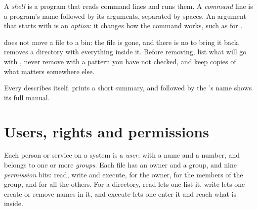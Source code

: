 \begin{definition}\label{def:g11:os-and-command-line:shell}
A \emph{shell} is a program that reads command lines and runs them. A \emph{command}
line is a program's name followed by its arguments, separated by spaces. An argument that starts with \code{-} is an
\emph{option}: it changes how the command works, such as  for .
\end{definition}

\label{out:g11:os-and-command-line:copy-move}

\begin{safety}
 does not move a file to a bin: the file is gone, and there is no  to bring it back. 
removes a directory with everything inside it. Before removing, list what will go with , never remove with
a pattern you have not checked, and keep copies of what matters somewhere else.
\end{safety}

Every  describes itself.  prints a short summary, and  followed by the 's name
shows its full manual.

\label{out:g11:os-and-command-line:manual}

\section{Users, rights and permissions}\label{sec:g11:os-and-command-line:permissions}

\begin{definition}\label{def:g11:os-and-command-line:permission}
Each person or service on a system is a \emph{user}, with a name and a number, and belongs to one or
more \emph{groups}. Each file has an owner and a group, and nine \emph{permission} bits:
read, write and execute, for the owner, for the members of the group, and for all the others. For a directory, read
lets one list it, write lets one create or remove names in it, and execute lets one enter it and reach what is
inside.
\end{definition}

